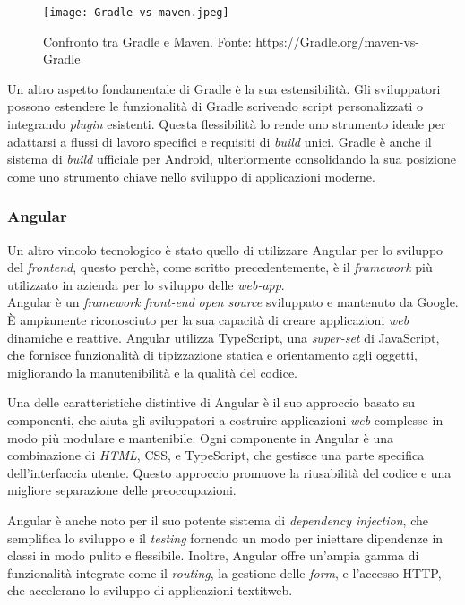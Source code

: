  \begin{figure}[!h] 
  \centering 
  \texttt{[image: Gradle-vs-maven.jpeg]} 
  \caption{Confronto tra Gradle e Maven. Fonte: https://Gradle.org/maven-vs-Gradle}
  \label{fig:gredle-vs-maven}
\end{figure}

Un altro aspetto fondamentale di Gradle è la sua estensibilità. Gli sviluppatori possono estendere le funzionalità di Gradle 
scrivendo script personalizzati o integrando \textit{plugin} esistenti. Questa flessibilità lo rende uno strumento ideale per adattarsi a 
flussi di lavoro specifici e requisiti di \textit{build} unici. Gradle è anche il sistema di \textit{build} ufficiale per Android, ulteriormente 
consolidando la sua posizione come uno strumento chiave nello sviluppo di applicazioni moderne.

\subsubsection*{Angular}
Un altro vincolo tecnologico è stato quello di utilizzare Angular per lo sviluppo del \textit{frontend}, 
questo perchè, come scritto precedentemente, è il \textit{framework} più utilizzato in azienda per lo sviluppo delle \textit{web-app}.\\

Angular è un \textit{framework} \textit{front-end} \textit{open source} sviluppato e mantenuto da Google. 
È ampiamente riconosciuto per la sua capacità di creare applicazioni \textit{web} dinamiche e reattive. 
Angular utilizza TypeScript, una \textit{super-set} di JavaScript, che fornisce funzionalità di tipizzazione statica e 
orientamento agli oggetti, migliorando la manutenibilità e la qualità del codice.

Una delle caratteristiche distintive di Angular è il suo approccio basato su componenti, che aiuta gli sviluppatori a 
costruire applicazioni \textit{web} complesse in modo più modulare e mantenibile. Ogni componente in Angular è una combinazione di \textit{HTML}, 
CSS, e TypeScript, che gestisce una parte specifica dell'interfaccia utente. Questo approccio promuove la riusabilità 
del codice e una migliore separazione delle preoccupazioni.

Angular è anche noto per il suo potente sistema di \textit{dependency injection}, che semplifica lo sviluppo e il \textit{testing} fornendo un 
modo per iniettare dipendenze in classi in modo pulito e flessibile. Inoltre, Angular offre un'ampia gamma di funzionalità integrate come il 
\textit{routing}, la gestione delle \textit{form}, e l'accesso HTTP, che accelerano lo sviluppo di applicazioni textit{web}.

